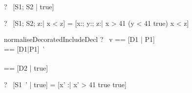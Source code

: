\begin{zed}
  \vdash?~ [S1; S2 | true] 
\end{zed}

\begin{zed}
  \vdash?~ [S1; S2; z:\nat | x < z] =
           [x:\nat; y:\nat; z:\nat | x > 41 \land (y < 41 \land true)
                                     \land x < z]
\end{zed}

\begin{zedrule}{normaliseDecoratedIncludeDecl}
   \proviso ?~ v == [D1 | P1] \\
   \proviso [D2|P2] == [D1|P1]~' \\
   [D | true] \unfoldsTo [D3 | P3] \\
   \proviso [D4 | true] == [D2 | true] \schemamerge [D3 | true]
\derives
   [v~'; D | true] \unfoldsTo [D4 | P2 \land P3]
\end{zedrule}

\begin{zed}
  \vdash?~ [S1~' | true]  = [x' :\nat | x' > 41 \land true \land true]
\end{zed}

